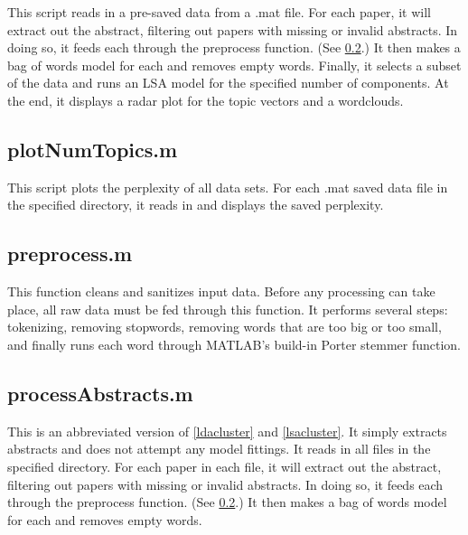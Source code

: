 \documentclass{article}
\begin{document}
This script reads in a pre-saved data from a .mat file. For each paper, it will extract out the abstract, filtering out papers with missing or invalid abstracts. In doing so, it feeds each through the preprocess function. (See \ref{preprocess}.) It then makes a bag of words model for each and removes empty words. Finally, it selects a subset of the data and runs an LSA model for the specified number of components. At the end, it displays a radar plot for the topic vectors and a wordclouds.



\subsection{plotNumTopics.m}

This script plots the perplexity of all data sets. For each .mat saved data file in the specified directory, it reads in and displays the saved perplexity.



\subsection{preprocess.m}
\label{preprocess}

This function cleans and sanitizes input data. Before any processing can take place, all raw data must be fed through this function. It performs several steps: tokenizing, removing stopwords, removing words that are too big or too small, and finally runs each word through MATLAB's build-in Porter stemmer function.



\subsection{processAbstracts.m}

This is an abbreviated version of \ref{ldacluster} and \ref{lsacluster}. It simply extracts abstracts and does not attempt any model fittings. It reads in all files in the specified directory. For each paper in each file, it will extract out the abstract, filtering out papers with missing or invalid abstracts. In doing so, it feeds each through the preprocess function. (See \ref{preprocess}.) It then makes a bag of words model for each and removes empty words.
\end{document}
